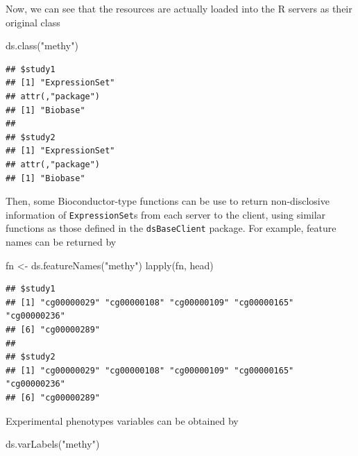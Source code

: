 \documentclass[
]{book}
\newenvironment{Shaded}{\begin{snugshade}}{\end{snugshade}}
\newcommand{\FunctionTok}[1]{\textcolor[rgb]{0.00,0.00,0.00}{#1}}
\newcommand{\NormalTok}[1]{#1}
\newcommand{\OtherTok}[1]{\textcolor[rgb]{0.56,0.35,0.01}{#1}}
\newcommand{\StringTok}[1]{\textcolor[rgb]{0.31,0.60,0.02}{#1}}
\begin{document}
Now, we can see that the resources are actually loaded into the R servers as their original class

\begin{Shaded}
\begin{Highlighting}[]
\FunctionTok{ds.class}\NormalTok{(}\StringTok{"methy"}\NormalTok{)}
\end{Highlighting}
\end{Shaded}

\begin{verbatim}
## $study1
## [1] "ExpressionSet"
## attr(,"package")
## [1] "Biobase"
## 
## $study2
## [1] "ExpressionSet"
## attr(,"package")
## [1] "Biobase"
\end{verbatim}

Then, some Bioconductor-type functions can be use to return non-disclosive information of \texttt{ExpressionSet}s from each server to the client, using similar functions as those defined in the \texttt{dsBaseClient} package. For example, feature names can be returned by

\begin{Shaded}
\begin{Highlighting}[]
\NormalTok{fn }\OtherTok{\textless{}{-}} \FunctionTok{ds.featureNames}\NormalTok{(}\StringTok{"methy"}\NormalTok{)}
\FunctionTok{lapply}\NormalTok{(fn, head)}
\end{Highlighting}
\end{Shaded}

\begin{verbatim}
## $study1
## [1] "cg00000029" "cg00000108" "cg00000109" "cg00000165" "cg00000236"
## [6] "cg00000289"
## 
## $study2
## [1] "cg00000029" "cg00000108" "cg00000109" "cg00000165" "cg00000236"
## [6] "cg00000289"
\end{verbatim}

Experimental phenotypes variables can be obtained by

\begin{Shaded}
\begin{Highlighting}[]
\FunctionTok{ds.varLabels}\NormalTok{(}\StringTok{"methy"}\NormalTok{)}
\end{Highlighting}
\end{Shaded}
\end{document}
